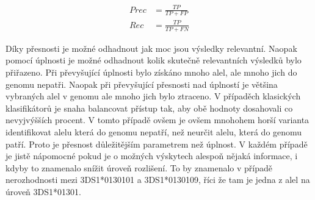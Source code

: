 \documentclass[czech,DP]{thesiskiv}
\numberwithin{equation}{section}
\begin{document}
\begin{center}
	\begin{align}
   		\label{precision2} Prec &= \frac{TP}{TP + FP} \\[30pt]
   		\label{recall2} Rec &= \frac{TP}{TP + FN}
	\end{align}
\end{center}

\noindent
Díky přesnosti je možné odhadnout jak moc jsou výsledky relevantní. Naopak pomocí úplnosti je možné odhadnout kolik skutečně relevantních výsledků bylo přiřazeno. Při převyšující úplnosti bylo získáno mnoho alel, ale mnoho jich do genomu nepatři. Naopak při převyšující přesnosti nad úplností je většina vybraných alel v genomu ale mnoho jich bylo ztraceno. V případěch klasických klasifikátorů je snaha balancovat přístup tak, aby obě hodnoty dosahovali co nevyjvýšších procent. V tomto případě ovšem je ovšem mnohohem horší varianta identifikovat alelu která do genomu nepatří, než neurčit alelu, která do genomu patří. Proto je přesnost důležitějším parametrem než úplnost. V každém případě je jistě nápomocné pokud je o možných výskytech alespoň nějaká informace, i kdyby to znamenalo snížit úroveň rozlišení. To by znamenalo v případě nerozhodnosti mezi 3DS1*0130101 a 3DS1*0130109, říci že tam je jedna z alel na úroveň 3DS1*01301. 
\end{document}
